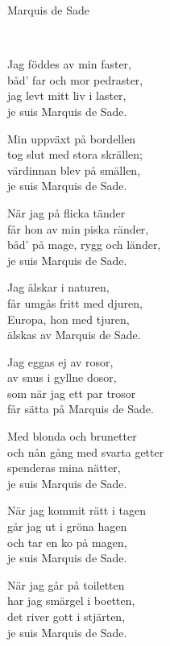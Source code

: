\begin{song}{Marquis de Sade}
	
	\\
	
	\showversenumber
	Jag föddes av min faster,\\
	båd' far och mor pedraster,\\
	jag levt mitt liv i laster,\\
	je suis Marquis de Sade.
	
	\showversenumber
	Min uppväxt på bordellen\\
	tog slut med stora skrällen;\\
	värdinnan blev på smällen,\\
	je suis Marquis de Sade.
	
	\showversenumber
	När jag på flicka tänder\\
	får hon av min piska ränder,\\
	båd' på mage, rygg och länder,\\
	je suis Marquis de Sade.
	
	\showversenumber
	Jag älskar i naturen,\\
	får umgås fritt med djuren,\\
	Europa, hon med tjuren,\\
	älskas av Marquis de Sade.
	
	\showversenumber
	Jag eggas ej av rosor,\\
	av snus i gyllne dosor,\\
	som när jag ett par trosor\\
	får sätta på Marquis de Sade.
	
	\showversenumber
	Med blonda och brunetter\\
	och nån gång med svarta getter\\
	spenderas mina nätter,\\
	je suis Marquis de Sade.
	
	\showversenumber
	När jag kommit rätt i tagen\\
	går jag ut i gröna hagen\\
	och tar en ko på magen,\\
	je suis Marquis de Sade.
	
	\showversenumber
	När jag går på toiletten\\
	har jag smärgel i boetten,\\
	det river gott i stjärten,\\
	je suis Marquis de Sade.
	

\end{song}
